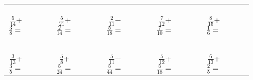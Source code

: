 \documentclass[12pt]{article}
\begin{document}
\begin{table}[H]
\begin{tabular}{ccccc  ccccc  ccccc ccccc}
&&&&&&&&&&&&&&&&&&\\
&&&&&&&&&&&&&&&&&&\\
&&&&&&&&&&&&&&&&&&\\
$\frac{5}{14}$+$\frac{3}{8}=$&&&&$\frac{5}{21}$+$\frac{2}{14}=$&&&&$\frac{2}{11}$+$\frac{5}{18}=$&&&&$\frac{7}{12}$+$\frac{7}{10}=$&&&&$\frac{8}{15}$+$\frac{1}{6}=$&&&\\
&&&&&&&&&&&&&&&&&&\\
&&&&&&&&&&&&&&&&&&\\
&&&&&&&&&&&&&&&&&&\\
&&&&&&&&&&&&&&&&&&\\
&&&&&&&&&&&&&&&&&&\\
$\frac{3}{13}$+$\frac{3}{5}=$&&&&$\frac{5}{8}$+$\frac{5}{24}=$&&&&$\frac{5}{11}$+$\frac{5}{44}=$&&&&$\frac{5}{12}$+$\frac{5}{18}=$&&&&$\frac{6}{13}$+$\frac{2}{5}=$&&&
 \end{tabular}
\end{table}
\end{document}
